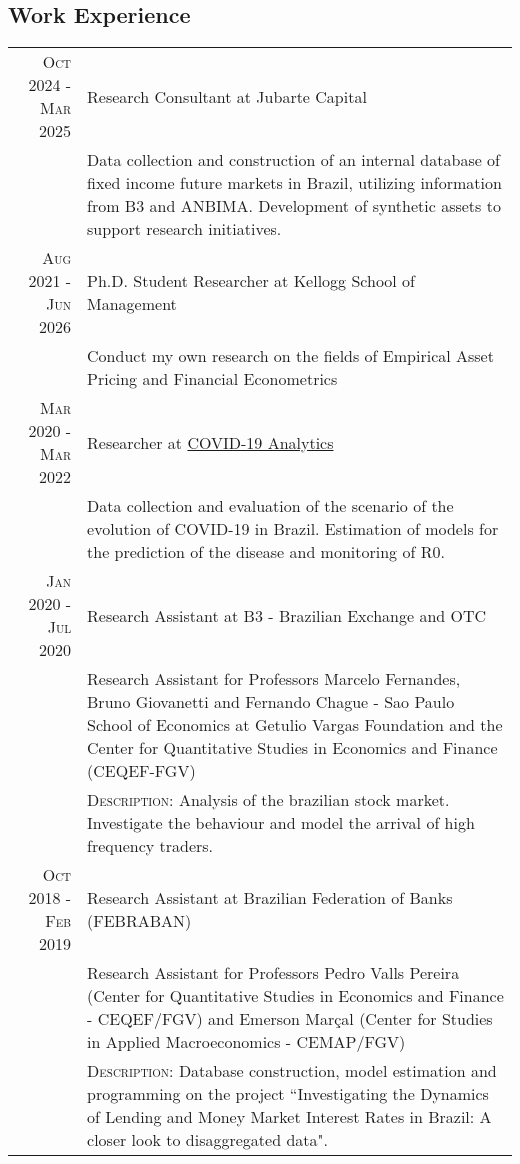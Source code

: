 \documentclass[a4paper,10pt]{article}
\begin{document}
\begin{samepage}
    \section{Work Experience}
    \begin{tabular}{r|p{10.75cm}}
        \textsc{Oct 2024 - Mar 2025} & Research Consultant at Jubarte Capital \\
        & \footnotesize{Data collection and construction of an internal database of fixed income future markets in Brazil, utilizing information from B3 and ANBIMA. Development of synthetic assets to support research initiatives.} \\
        \textsc{Aug 2021 - Jun 2026} & Ph.D. Student Researcher at Kellogg School of Management \\
        & \footnotesize{Conduct my own research on the fields of Empirical Asset Pricing and Financial Econometrics} \\
        \textsc{Mar 2020 - Mar 2022} & Researcher at \href{https://covid19analytics.com.br/}{COVID-19 Analytics} \\
        &\footnotesize{Data collection and evaluation of the scenario of the evolution of COVID-19 in Brazil. Estimation of models for the prediction of the disease and monitoring of R0.} \\
        \textsc{Jan 2020 - Jul 2020} & Research Assistant at B3 - Brazilian Exchange and OTC \\
        &\footnotesize{Research Assistant for Professors Marcelo Fernandes, Bruno Giovanetti and Fernando Chague - Sao Paulo School of Economics at Getulio Vargas Foundation and the Center for Quantitative Studies in Economics and Finance (CEQEF-FGV)} \\
        &\footnotesize{\textsc{Description}: Analysis of the brazilian stock market. Investigate the behaviour and model the arrival of high frequency traders.} \\
        \textsc{Oct 2018 - Feb 2019} & Research Assistant at Brazilian Federation of Banks (FEBRABAN) \\
        &\footnotesize{Research Assistant for Professors Pedro Valls Pereira (Center for Quantitative Studies in Economics and Finance - CEQEF/FGV) and Emerson Marçal (Center for Studies in Applied Macroeconomics - CEMAP/FGV)}\\
        &\footnotesize{\textsc{Description}: Database construction, model estimation and programming on the project ``Investigating the Dynamics of Lending and Money Market Interest Rates in Brazil: A closer look to disaggregated data".}
    \end{tabular}
\end{samepage}
\end{document}
